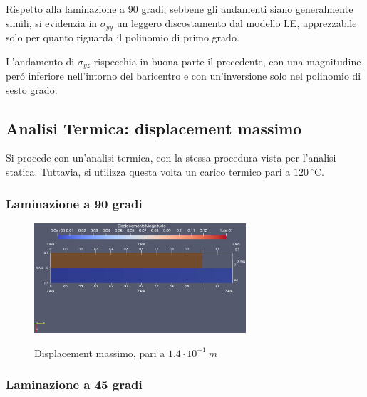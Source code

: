 \documentclass{article}
\begin{document}
            Rispetto alla laminazione a 90 gradi, sebbene gli andamenti siano generalmente simili, si evidenzia in 
            $\sigma_{yy}$ un leggero discostamento dal modello LE, apprezzabile solo per quanto riguarda il polinomio di primo grado.

            L'andamento di $\sigma_{yz}$ rispecchia in buona parte il precedente, con una magnitudine peró inferiore nell'intorno
            del baricentro e con un'inversione solo nel polinomio di sesto grado.

            \clearpage


            \subsection{Analisi Termica: displacement massimo \label{displacement_massimo_thermal}}

            Si procede con un'analisi termica, con la stessa procedura vista per l'analisi statica. Tuttavia,
            si utilizza questa volta un carico termico pari a $120 \ _{}^{\circ}\textrm{C}$. 

            \subsubsection{Laminazione a 90 gradi \label{displacement_massimo_90_thermal}}

            \begin{figure}[h!]
                 \label{fig:displacement_90_thermal}
                \centering
                \includegraphics[width=0.7\textwidth]{MUL2/Esercitazione3/MUL2_FEM/OUTPUT/static/Displacement_Z/displacement_thermal_90.eps}
                \caption{Displacement massimo, pari a $1.4 \cdot 10^{-1} \ m$}
            \end{figure}


            \subsubsection{Laminazione a 45 gradi \label{displacement_massimo_45_thermal}}
\end{document}
